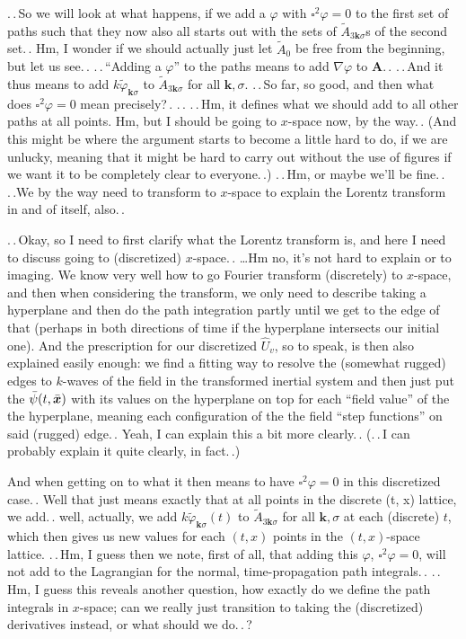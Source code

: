 \documentclass{report}
\begin{document}
.\,.\,So we will look at what happens, if we add a $\varphi$ with $\square^2\varphi = 0$ to the first set of paths such that they now also all starts out with the sets of $\tilde A_{3\boldsymbol{k}\sigma}$s of the second set.\,. Hm, I wonder if we should actually just let $\tilde A_{0}$ be free from the beginning, but let us see.\,. .\,.\,``Adding a $\varphi$'' to the paths means to add $\nabla \varphi$ to $\boldsymbol{A}$.\,. .\,.\,And it thus means to add $k\tilde\varphi_{\boldsymbol{k}\sigma}$ to $\tilde A_{3\boldsymbol{k}\sigma}$ for all $\boldsymbol{k},\sigma$. .\,.\,So far, so good, and then what does $\square^2\varphi = 0$ mean precisely?\,. .\,. .\,.\,Hm, it defines what we should add to all other paths at all points. Hm, but I should be going to $x$-space now, by the way.\,. (And this might be where the argument starts to become a little hard to do, if we are unlucky, meaning that it might be hard to carry out without the use of figures if we want it to be completely clear to everyone.\,.) .\,.\,Hm, or maybe we'll be fine.\,. .\,.We by the way need to transform to $x$-space to explain the Lorentz transform in and of itself, also.\,. 

.\,.\,Okay, so I need to first clarify what the Lorentz transform is, and here I need to discuss going to (discretized) $x$-space.\,. \ldots Hm no, it's not hard to explain or to imaging. We know very well how to go Fourier transform (discretely) to $x$-space, and then when considering the transform, we only need to describe taking a hyperplane and then do the path integration partly until we get to the edge of that (perhaps in both directions of time if the hyperplane intersects our initial one). And the prescription for our discretized $\hat U_v$, so to speak, is then also explained easily enough: we find a fitting way to resolve the (somewhat rugged) edges to $k$-waves of the field in the transformed inertial system and then just put the $\bar\psi(t, \bar{\boldsymbol{x}\hspace{.05em}}\hspace{-.05em})$ with its values on the hyperplane on top for each ``field value'' of the the hyperplane, meaning each configuration of the the field ``step functions'' on said (rugged) edge.\,. Yeah, I can explain this a bit more clearly.\,. (.\,.\,I can probably explain it quite clearly, in fact.\,.)

And when getting on to what it then means to have $\square^2\varphi = 0$ in this discretized case.\,. Well that just means exactly that at all points in the discrete (t, x) lattice, we add.\,. well, actually, we add $k\tilde\varphi_{\boldsymbol{k}\sigma}(t)$ to $\tilde A_{3\boldsymbol{k}\sigma}$ for all $\boldsymbol{k},\sigma$ at each (discrete) $t$, which then gives us new values for each $(t, x)$ points in the $(t,x)$-space lattice. .\,.\,Hm, I guess then we note, first of all, that adding this $\varphi$, $\square^2\varphi = 0$, will not add to the Lagrangian for the normal, time-propagation path integrals.\,. .\,.\,Hm, I guess this reveals another question, how exactly do we define the path integrals in $x$-space; can we really just transition to taking the (discretized) derivatives instead, or what should we do.\,.\,? 
\end{document}
